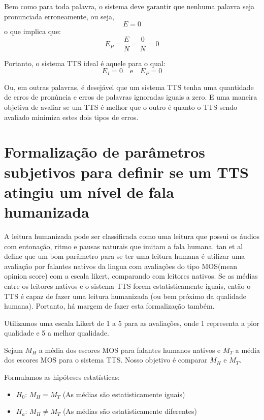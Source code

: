 \documentclass{article}
\begin{document}
Bem como para toda palavra, o sistema deve garantir que nenhuma palavra seja pronunciada erroneamente, ou seja,
\begin{equation}
E = 0
\end{equation}
o que implica que:
\begin{equation}
E_P = \frac{E}{N} = \frac{0}{N} = 0
\end{equation}

Portanto, o sistema TTS ideal é aquele para o qual:
\begin{equation}
E_I = 0 \quad \text{e} \quad E_P = 0
\end{equation}

Ou, em outras palavras, é desejável que um sistema TTS tenha uma quantidade de erros de pronúncia e erros de palavras ignoradas iguais a zero. E uma maneira objetiva de avaliar se um TTS é melhor que o outro é quanto o TTS sendo avaliado minimiza estes dois tipos de erros.

\section{Formalização de parâmetros subjetivos para definir se um TTS atingiu um nível de fala humanizada}

A leitura humanizada pode ser classificada como uma leitura que possui os áudios com entonação, ritmo e pausas naturais que imitam a fala humana. tan et al \cite{tan2022naturalspeech} define que um bom parâmetro para se ter uma leitura humana é utilizar uma avaliação por falantes nativos da lingua com avaliações do tipo MOS(mean opinion score) com a escala likert, comparando com leitores nativos. Se as médias entre os leitores nativos e o sistema TTS forem estatisticamente iguais, então o TTS é capaz de fazer uma leitura humanizada (ou bem próximo da qualidade humana). Portanto, há margem de fazer esta formalização também.

Utilizamos uma escala Likert de 1 a 5 para as avaliações, onde 1 representa a pior qualidade e 5 a melhor qualidade.

Sejam $M_H$ a média dos escores MOS para falantes humanos nativos e $M_T$ a média dos escores MOS para o sistema TTS. Nosso objetivo é comparar $M_H$ e $M_T$.

Formulamos as hipóteses estatísticas:

\begin{itemize}
    \item $H_0$: $M_H = M_T$ (As médias são estatisticamente iguais)
    \item $H_a$: $M_H \neq M_T$ (As médias são estatisticamente diferentes)
\end{itemize}
\end{document}
